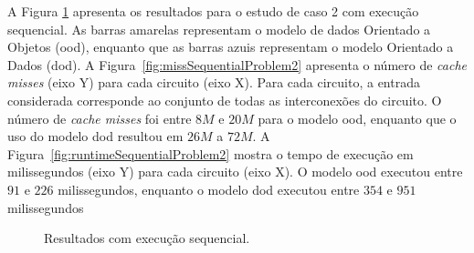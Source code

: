 A Figura \ref{fig:problem2resultSequencial} apresenta os resultados para o estudo de caso 2 com execução sequencial. As barras amarelas representam o modelo de dados Orientado a Objetos (\ac{ood}), enquanto que as barras azuis representam o modelo Orientado a Dados (\ac{dod}). A Figura~\ref{fig:missSequentialProblem2} apresenta o número de  \textit{cache misses} (eixo Y) para cada circuito (eixo X). Para cada circuito, a entrada considerada corresponde ao conjunto de todas as interconexões do circuito.
O número de  \textit{cache misses} foi entre $8M$ e $20M$ para o modelo \ac{ood}, enquanto que o uso do modelo \ac{dod} resultou em $26M$ a $72M$.
A Figura~\ref{fig:runtimeSequentialProblem2} mostra o tempo de execução em milissegundos (eixo Y) para cada circuito (eixo X).
O modelo \ac{ood} executou entre $91$ e $226$ milissegundos, enquanto o modelo \ac{dod} executou entre $354$ e $951$ milissegundos 

\begin{figure}[ht]
    \centering
    \caption[Resultados estudo de caso 2 com execução sequencial]{Resultados com execução sequencial.}
    \label{fig:problem2resultSequencial}
\end{figure}

